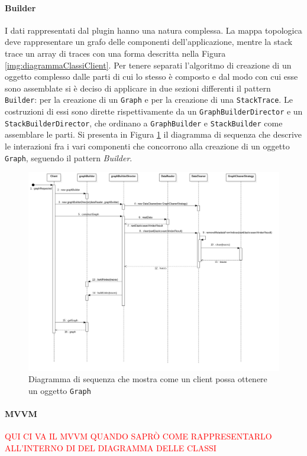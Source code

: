 \paragraph{Builder} \Spazio
\label{sec:patternBuilder}
I dati rappresentati dal plugin hanno una natura complessa. La mappa topologica deve rappresentare un grafo delle componenti dell'applicazione, mentre la stack trace un array di traces con una forma descritta nella Figura \ref{img:diagrammaClassiClient}. Per tenere separati l'algoritmo di creazione di un oggetto complesso dalle parti di cui lo stesso è composto e dal modo con cui esse sono assemblate si è deciso di applicare in due sezioni differenti il pattern \texttt{Builder}: per la creazione di un \texttt{Graph} e per la creazione di una \texttt{StackTrace}. Le costruzioni di essi sono dirette rispettivamente da un \texttt{GraphBuilderDirector} e un \texttt{StackBuilderDirector}, che ordinano a \texttt{GraphBuilder} e \texttt{StackBuilder} come assemblare le parti. 
Si presenta in Figura \ref{img:builderGraph} il diagramma di sequenza che descrive le interazioni fra i vari componenti che concorrono alla creazione di un oggetto \texttt{Graph}, seguendo il pattern \emph{Builder}.


\begin{figure}[H]
	\centering
	\includegraphics[width=1\textwidth]{Images/builderGraphSequence.png}
	\caption{Diagramma di sequenza che mostra come un client possa ottenere un oggetto \texttt{Graph}}
	\label{img:builderGraph}
\end{figure}

\paragraph{MVVM} \Spazio
\textcolor{red}{QUI CI VA IL MVVM QUANDO SAPRÒ COME RAPPRESENTARLO ALL'INTERNO DI DEL DIAGRAMMA DELLE CLASSI}

